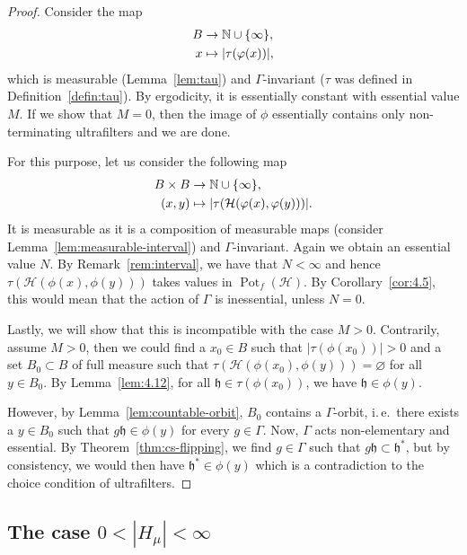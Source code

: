 \begin{proof}
  Consider the map
  \begin{align*}
    B & \to \mathbb{N} \cup \{\infty\},\\
    x & \mapsto |\tau(\varphi(x))|,
  \end{align*}
  which is measurable (Lemma~\ref{lem:tau}) and \(\Gamma\)-invariant (\(\tau\) was defined in Definition~\ref{defin:tau}). By ergodicity, it is essentially constant with essential value \(M\). If we show that \(M = 0\), then the image of \(\phi\) essentially contains only non-terminating ultrafilters and we are done.

  For this purpose, let us consider the following map
  \begin{align*}
    B \times B & \to \mathbb{N} \cup \{\infty\},\\
    (x,y) & \mapsto |\tau(\mathcal{H}(\varphi(x), \varphi(y)))|.
  \end{align*}
  It is measurable as it is a composition of measurable maps (consider Lemma~\ref{lem:measurable-interval}) and \(\Gamma\)-invariant. Again we obtain an essential value \(N\). By Remark~\ref{rem:interval}, we have that \(N < \infty\) and hence \(\tau(\mathcal{H}(\phi(x), \phi(y)))\) takes values in \(\operatorname{Pot}_f(\mathcal{H})\). By Corollary~\ref{cor:4.5}, this would mean that the action of \(\Gamma\) is inessential, unless \(N = 0\).

  Lastly, we will show that this is incompatible with the case \(M > 0\). Contrarily, assume \(M > 0\), then we could find a \(x_0 \in B\) such that \(|\tau(\phi(x_0))| > 0\) and a set \(B_0 \subset B\) of full measure such that \(\tau(\mathcal{H}(\phi(x_0), \phi(y))) = \varnothing\) for all \(y \in B_0\). By Lemma~\ref{lem:4.12}, for all \(\mathfrak{h} \in \tau(\phi(x_0))\), we have \(\mathfrak{h} \in \phi(y)\).

  However, by Lemma~\ref{lem:countable-orbit}, \(B_0\) contains a \(\Gamma\)-orbit, i.\,e.\ there exists a \(y \in B_0\) such that \(g\mathfrak{h} \in \phi(y)\) for every \(g \in \Gamma\). Now, \(\Gamma\) acts non-elementary and essential. By Theorem~\ref{thm:cs-flipping}, we find \(g \in \Gamma\) such that \(g\mathfrak{h} \subset \mathfrak{h}^\ast\), but by consistency, we would then have \(\mathfrak{h}^\ast \in \phi(y)\) which is a contradiction to the choice condition of ultrafilters.
\end{proof}

\subsection{The case \(0 < |H_\mu| < \infty\)}
\label{sec:N=finite}

